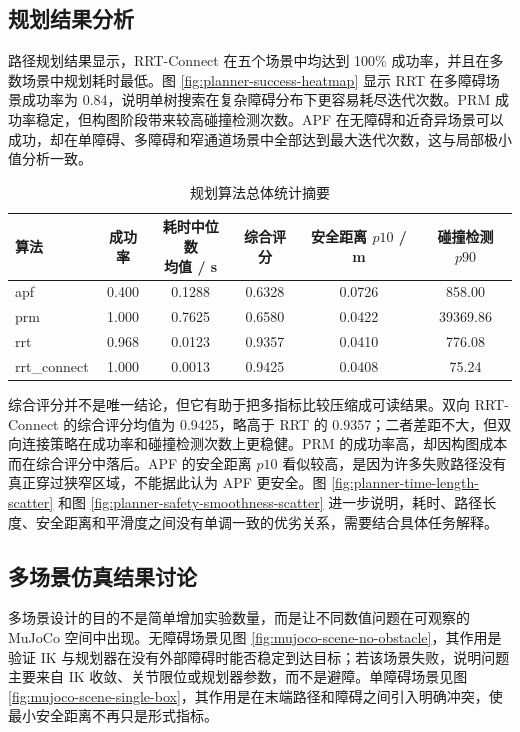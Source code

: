 \documentclass[UTF8,zihao=-4]{ctexart}
\begin{document}
\subsection{规划结果分析}
路径规划结果显示，RRT-Connect 在五个场景中均达到 100\% 成功率，并且在多数场景中规划耗时最低。图 \ref{fig:planner-success-heatmap} 显示 RRT 在多障碍场景成功率为 0.84，说明单树搜索在复杂障碍分布下更容易耗尽迭代次数。PRM 成功率稳定，但构图阶段带来较高碰撞检测次数。APF 在无障碍和近奇异场景可以成功，却在单障碍、多障碍和窄通道场景中全部达到最大迭代次数，这与局部极小值分析一致。

\begin{table}[!htbp]
  \centering
  \caption{规划算法总体统计摘要}
  \label{tab:planner-summary-short}
  \small
  \begin{tabularx}{\textwidth}{lccccc}
    \toprule
    算法 & 成功率 & \makecell{耗时中位数\\均值 / s} & 综合评分 & \makecell{安全距离\\$p10$ / m} & \makecell{碰撞检测\\$p90$} \\
    \midrule
    apf & 0.400 & 0.1288 & 0.6328 & 0.0726 & 858.00 \\
    prm & 1.000 & 0.7625 & 0.6580 & 0.0422 & 39369.86 \\
    rrt & 0.968 & 0.0123 & 0.9357 & 0.0410 & 776.08 \\
    rrt\_connect & 1.000 & 0.0013 & 0.9425 & 0.0408 & 75.24 \\
    \bottomrule
  \end{tabularx}
\end{table}

综合评分并不是唯一结论，但它有助于把多指标比较压缩成可读结果。双向 RRT-Connect 的综合评分均值为 0.9425，略高于 RRT 的 0.9357；二者差距不大，但双向连接策略在成功率和碰撞检测次数上更稳健。PRM 的成功率高，却因构图成本而在综合评分中落后。APF 的安全距离 $p10$ 看似较高，是因为许多失败路径没有真正穿过狭窄区域，不能据此认为 APF 更安全。图 \ref{fig:planner-time-length-scatter} 和图 \ref{fig:planner-safety-smoothness-scatter} 进一步说明，耗时、路径长度、安全距离和平滑度之间没有单调一致的优劣关系，需要结合具体任务解释。

\subsection{多场景仿真结果讨论}
多场景设计的目的不是简单增加实验数量，而是让不同数值问题在可观察的 MuJoCo 空间中出现。无障碍场景见图 \ref{fig:mujoco-scene-no-obstacle}，其作用是验证 IK 与规划器在没有外部障碍时能否稳定到达目标；若该场景失败，说明问题主要来自 IK 收敛、关节限位或规划器参数，而不是避障。单障碍场景见图 \ref{fig:mujoco-scene-single-box}，其作用是在末端路径和障碍之间引入明确冲突，使最小安全距离不再只是形式指标。
\end{document}
